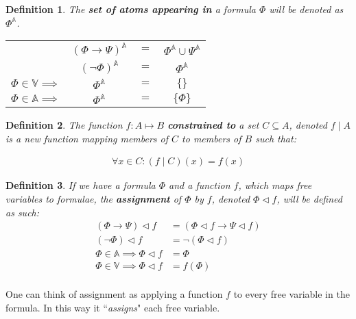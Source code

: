 \documentclass{article}
\newtheorem{defin}{Definition}
\begin{document}
\begin{defin}
The \textbf{set of atoms appearing in} a formula $\Phi$ will be denoted as $\Phi^\mathbb{A}$.
\setlength{\tabcolsep}{1pt}
\begin{center}
	\begin{tabular}{rclc}
		                               & $(\Phi \rightarrow \Psi)^\mathbb{A}$ & $=$ & $ \Phi^\mathbb{A} \cup \Psi^\mathbb{A}$ \\
		                               & $(\neg \Phi)^\mathbb{A}            $ & $=$ & $ \Phi^\mathbb{A}               $ \\
		$\Phi \in \mathbb{V} \implies$ & $\Phi^\mathbb{A}                   $ & $=$ & $ \{\}                    $ \\
		$\Phi \in \mathbb{A} \implies$ & $\Phi^\mathbb{A}                   $ & $=$ & $ \{\Phi\}                $
	\end{tabular}
\end{center}
\end{defin}
\begin{defin}
The function $f : A \mapsto B$ \textbf{constrained to} a set $C \subseteq A$, denoted $f \mid A$ is a new function mapping
members of $C$ to members of $B$ such that:

\begin{align*}
\forall x \in C : (f \mid C) (x) = f (x)
\end{align*}
\end{defin}

\begin{defin}
If we have a formula $\Phi$ and a function $f$, which maps free variables to formulae,
the \textbf{assignment} of $\Phi$ by $f$, denoted $\Phi \lhd f$, will be defined as such:
\begin{align*}
(\Phi \rightarrow \Psi) \lhd f &= (\Phi \lhd f \rightarrow \Psi \lhd f) \\
(\neg \Phi) \lhd f &= \neg (\Phi \lhd f) \\
\Phi \in \mathbb{A} \implies \Phi \lhd f &= \Phi \\
\Phi \in \mathbb{V} \implies \Phi \lhd f &= f(\Phi) \\
\end{align*}
\end{defin}

One can think of assignment as applying a function $f$ to every free variable in the formula.
In this way it ``\textit{assigns}" each free variable.
\end{document}
